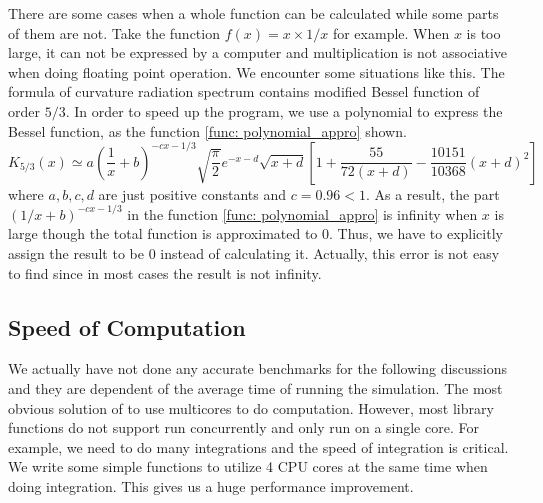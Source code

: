 \documentclass[12pt]{report}
\begin{document}
          There are some cases when a whole function can be calculated while some parts of them are not. 
          Take the function $f\left(x\right) = x\times1/x$ for example. When $x$ is too large, it 
          can not be expressed by a computer and multiplication is not associative when doing floating 
          point operation. We encounter some situations like this.
          The formula of curvature radiation spectrum contains modified Bessel function of order $5/3$.
          In order to speed up the program, we use a polynomial to express the Bessel function, as the 
          function \ref{func: polynomial_appro} shown. 
          \begin{equation}
            K_{5/3} \left(x\right) \simeq a \left(\frac{1}{x} + b\right)^{-cx - 1/3} \sqrt{\frac{\pi}{2}} e^{-x - d} \sqrt{x + d} %
            \left[1 + \frac{55}{72\left(x + d\right)} - \frac{10151}{10368}\left(x+d\right)^2\right] 
            \label{func: polynomial_appro}
          \end{equation}
          where $a,b,c,d$ are just positive constants and $c = 0.96 < 1$. As a result, 
          the part $(1/x + b)^{-cx - 1/3}$ in the function \ref{func: polynomial_appro} is infinity
          when $x$ is large though the total function is approximated to $0$. Thus, we have to explicitly 
          assign the result to be $0$ instead of calculating it. Actually, this error is not easy to find 
          since in most cases the result is not infinity. 
          
        \subsection{Speed of Computation}
          We actually have not done any accurate benchmarks for the following discussions and they are 
          dependent of the average time of running the simulation.
          The most obvious solution of to use multicores to do computation. However, most library functions 
          do not support run concurrently and only run on a single core. For example, we need to do many 
          integrations and the speed of integration is critical. We write some simple functions to 
          utilize 4 CPU cores at the same time when doing integration. 
          This gives us a huge performance improvement.
\end{document}
